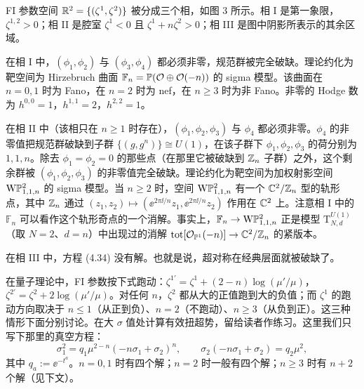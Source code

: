 
FI 参数空间 $\mathbb{R}^2=\{(\zeta^1,\zeta^2)\}$ 被分成三个相，如图 3 所示。相 I 是第一象限，$\zeta^{1,2}>0$；相 II 是腔室 $\zeta^1<0$ 且 $\zeta^1+n\zeta^2>0$；相 III 是图中阴影所表示的其余区域。

在相 I 中，$(\phi_1,\phi_2)$ 与 $(\phi_3,\phi_4)$ 都必须非零，规范群被完全破缺。理论约化为靶空间为 Hirzebruch 曲面 $\mathbb{F}_n=\mathbb{P}(\mathcal{O}\oplus\mathcal{O}(-n))$ 的 sigma 模型。该曲面在 $n=0,1$ 时为 Fano，在 $n=2$ 时为 nef，在 $n\ge 3$ 时为非 Fano。非零的 Hodge 数为 $h^{0,0}=1$，$h^{1,1}=2$，$h^{2,2}=1$。

在相 II 中（该相只在 $n\ge 1$ 时存在），$(\phi_1,\phi_2,\phi_3)$ 与 $\phi_4$ 都必须非零。$\phi_4$ 的非零值把规范群破缺到子群 $\{(g,g^n)\}\cong U(1)$，在该子群下 $\phi_1,\phi_2,\phi_3$ 的荷分别为 $1,1,n$。除去 $\phi_1=\phi_2=0$ 的那些点（在那里它被破缺到 $\mathbb{Z}_n$ 子群）之外，这个剩余群被 $(\phi_1,\phi_2,\phi_3)$ 的非零值完全破缺。理论约化为靶空间为加权射影空间 $\mathrm{W}\mathbb{P}^2_{1,1,n}$ 的 sigma 模型。当 $n\ge 2$ 时，空间 $\mathrm{W}\mathbb{P}^2_{1,1,n}$ 有一个 $\mathbb{C}^2/\mathbb{Z}_n$ 型的轨形点，其中 $\mathbb{Z}_n$ 通过 $(z_1,z_2)\mapsto(\ee^{2\pi\ii/n}z_1,\ee^{2\pi\ii/n}z_2)$ 作用在 $\mathbb{C}^2$ 上。注意相 I 中的 $\mathbb{F}_n$ 可以看作这个轨形奇点的一个消解。事实上，$\mathbb{F}_n\to\mathrm{W}\mathbb{P}^2_{1,1,n}$ 正是模型 $\mathrm{T}^{U(1)}_{N,d}$（取 $N=2$、$d=n$）中出现过的消解 $\mathrm{tot}[\mathcal{O}_{\mathbb{P}^1}(-n)]\to\mathbb{C}^2/\mathbb{Z}_n$ 的紧版本。

在相 III 中，方程 (4.34) 没有解。也就是说，超对称在经典层面就被破缺了。

在量子理论中，FI 参数按下式跑动：$\zeta^{1'}=\zeta^1+(2-n)\log(\mu'/\mu)$，$\zeta^{2'}=\zeta^2+2\log(\mu'/\mu)$。对任何 $n$，$\zeta^2$ 都从大的正值跑到大的负值；而 $\zeta^1$ 的跑动方向取决于 $n\le 1$（从正到负）、$n=2$（不跑动）、$n\ge 3$（从负到正）。这三种情形下面分别讨论。在大 $\sigma$ 值处计算有效扭超势，留给读者作练习。这里我们只写下那里的真空方程：
\begin{equation}
    \sigma_1^2=q_1\mu^{2-n}(-n\sigma_1+\sigma_2)^n,\qquad
    \sigma_2(-n\sigma_1+\sigma_2)=q_2\mu^2, \tag{4.35}
\end{equation}
其中 $q_a:=\ee^{-t^a}$。$n=0,1$ 时有四个解；$n=2$ 时一般有四个解；$n\ge 3$ 时有 $n+2$ 个解（见下文）。


